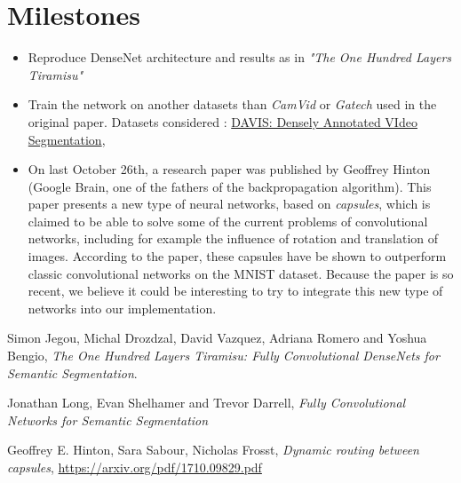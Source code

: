 \documentclass[a4,12pt]{article}
\begin{document}
	\section{Milestones}
	\begin{itemize}
		\item Reproduce DenseNet architecture and results as in \textit{"The One Hundred Layers Tiramisu"} \cite{tiramisu}
		\item Train the network on another datasets than \textit{CamVid} or \textit{Gatech} used in the original paper. Datasets considered : \href{http://davischallenge.org/}{DAVIS: Densely Annotated VIdeo Segmentation}, 
		\item On last October 26th, a research paper \cite{capsules-paper} was published by Geoffrey Hinton (Google Brain, one of the fathers of the backpropagation algorithm). This paper presents a new type of neural networks, based on \textit{capsules}, which is claimed to be able to solve some of the current problems of convolutional networks, including for example the influence of rotation and translation of images. According to the paper, these capsules have be shown to outperform classic convolutional networks on the MNIST dataset. Because the paper is so recent, we believe it could be interesting to try to integrate this new type of networks into our implementation. 
	\end{itemize}
	
	\begin{thebibliography}{9}
		
		Simon Jegou, Michal Drozdzal, David Vazquez, Adriana Romero and Yoshua Bengio,
		\textit{The One Hundred Layers Tiramisu: Fully Convolutional DenseNets for Semantic Segmentation}.
		
		Jonathan Long, Evan Shelhamer and Trevor Darrell,
		\textit{Fully Convolutional Networks for Semantic Segmentation}
		
		Geoffrey E. Hinton, Sara Sabour, Nicholas Frosst,
		\textit{Dynamic routing between capsules},
		\url{https://arxiv.org/pdf/1710.09829.pdf}
		
	\end{thebibliography}
\end{document}
